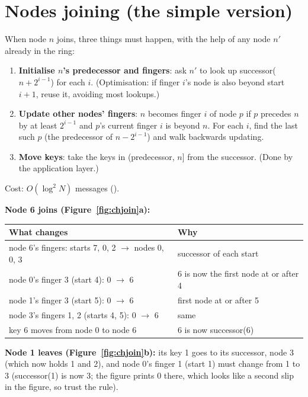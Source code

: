 \section{Nodes joining (the simple version)}

When node $n$ joins, three things must happen, with the help of any node $n'$ already in the ring:
\begin{enumerate}
  \item \textbf{Initialise $n$'s predecessor and fingers}: ask $n'$ to look up successor($n + 2^{i-1}$) for each $i$. (Optimisation: if finger $i$'s
        node is also beyond start $i+1$, reuse it, avoiding most lookups.)
  \item \textbf{Update other nodes' fingers}: $n$ becomes finger $i$ of node $p$ if $p$ precedes $n$ by at least $2^{i-1}$ and $p$'s current finger $i$
        is beyond $n$. For each $i$, find the last such $p$ (the predecessor of $n - 2^{i-1}$) and walk backwards updating.
  \item \textbf{Move keys}: take the keys in (predecessor, $n$] from the successor. (Done by the application layer.)
\end{enumerate}
Cost: $O(\log^2 N)$ messages ().


\textbf{Node 6 joins (Figure~\ref{fig:chjoin}a):}
\begin{center}
\small
\begin{tabular}{@{}ll@{}}
\toprule
What changes & Why\\
\midrule
node 6's fingers: starts 7, 0, 2 $\to$ nodes 0, 0, 3 & successor of each start\\
node 0's finger 3 (start 4): 0 $\to$ 6 & 6 is now the first node at or after 4\\
node 1's finger 3 (start 5): 0 $\to$ 6 & first node at or after 5\\
node 3's fingers 1, 2 (starts 4, 5): 0 $\to$ 6 & same\\
key 6 moves from node 0 to node 6 & 6 is now successor(6)\\
\bottomrule
\end{tabular}
\end{center}
\textbf{Node 1 leaves (Figure~\ref{fig:chjoin}b):} its key 1 goes to its successor, node 3 (which now holds 1 and 2), and node 0's finger 1 (start 1)
must change from 1 to 3 (successor(1) is now 3; the figure prints 0 there, which looks like a second slip in the figure, so trust the rule).


